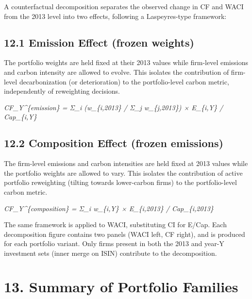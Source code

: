 \documentclass[
  11pt,
]{article}
\begin{document}
A counterfactual decomposition separates the observed change in CF and
WACI from the 2013 level into two effects, following a Laspeyres-type
framework:

\hypertarget{emission-effect-frozen-weights}{%
\subsection{12.1 Emission Effect (frozen
weights)}\label{emission-effect-frozen-weights}}

The portfolio weights are held fixed at their 2013 values while
firm-level emissions and carbon intensity are allowed to evolve. This
isolates the contribution of firm-level decarbonization (or
deterioration) to the portfolio-level carbon metric, independently of
reweighting decisions.

\emph{CF\_Y\^{}\{emission\} = Σ\_i (w\_\{i,2013\} / Σ\_j w\_\{j,2013\})
× E\_\{i,Y\} / Cap\_\{i,Y\}}

\hypertarget{composition-effect-frozen-emissions}{%
\subsection{12.2 Composition Effect (frozen
emissions)}\label{composition-effect-frozen-emissions}}

The firm-level emissions and carbon intensities are held fixed at 2013
values while the portfolio weights are allowed to vary. This isolates
the contribution of active portfolio reweighting (tilting towards
lower-carbon firms) to the portfolio-level carbon metric.

\emph{CF\_Y\^{}\{composition\} = Σ\_i w\_\{i,Y\} × E\_\{i,2013\} /
Cap\_\{i,2013\}}

The same framework is applied to WACI, substituting CI for E/Cap. Each
decomposition figure contains two panels (WACI left, CF right), and is
produced for each portfolio variant. Only firms present in both the 2013
and year-Y investment sets (inner merge on ISIN) contribute to the
decomposition.

\hypertarget{summary-of-portfolio-families}{%
\section{13. Summary of Portfolio
Families}\label{summary-of-portfolio-families}}
\end{document}
